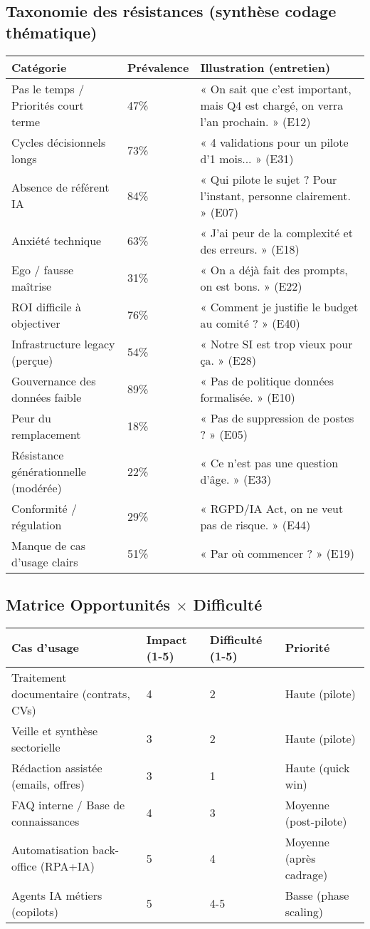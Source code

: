 \subsection{Taxonomie des résistances (synthèse codage thématique)}
\begin{longtable}{@{}p{6.5cm}p{2.5cm}p{6cm}@{}}
\toprule
\textbf{Catégorie} & \textbf{Prévalence} & \textbf{Illustration (entretien)} \\
\midrule
Pas le temps / Priorités court terme & 47\% & « On sait que c'est important, mais Q4 est chargé, on verra l'an prochain. » (E12) \\
Cycles décisionnels longs & 73\% & « 4 validations pour un pilote d'1 mois... » (E31) \\
Absence de référent IA & 84\% & « Qui pilote le sujet ? Pour l'instant, personne clairement. » (E07) \\
Anxiété technique & 63\% & « J'ai peur de la complexité et des erreurs. » (E18) \\
Ego / fausse maîtrise & 31\% & « On a déjà fait des prompts, on est bons. » (E22) \\
ROI difficile à objectiver & 76\% & « Comment je justifie le budget au comité ? » (E40) \\
Infrastructure legacy (perçue) & 54\% & « Notre SI est trop vieux pour ça. » (E28) \\
Gouvernance des données faible & 89\% & « Pas de politique données formalisée. » (E10) \\
Peur du remplacement & 18\% & « Pas de suppression de postes ? » (E05) \\
Résistance générationnelle (modérée) & 22\% & « Ce n'est pas une question d'âge. » (E33) \\
Conformité / régulation & 29\% & « RGPD/IA Act, on ne veut pas de risque. » (E44) \\
Manque de cas d'usage clairs & 51\% & « Par où commencer ? » (E19) \\
\bottomrule
\end{longtable}

\subsection{\texorpdfstring{Matrice Opportunités $\times$ Difficulté}{Matrice Opportunités x Difficulté}}
\begin{longtable}{@{}p{5.5cm}p{3cm}p{3cm}p{3.5cm}@{}}
\toprule
\textbf{Cas d'usage} & \textbf{Impact (1-5)} & \textbf{Difficulté (1-5)} & \textbf{Priorité} \\
\midrule
Traitement documentaire (contrats, CVs) & 4 & 2 & Haute (pilote) \\
Veille et synthèse sectorielle & 3 & 2 & Haute (pilote) \\
Rédaction assistée (emails, offres) & 3 & 1 & Haute (quick win) \\
FAQ interne / Base de connaissances & 4 & 3 & Moyenne (post-pilote) \\
Automatisation back-office (RPA+IA) & 5 & 4 & Moyenne (après cadrage) \\
Agents IA métiers (copilots) & 5 & 4-5 & Basse (phase scaling) \\
\bottomrule
\end{longtable}

